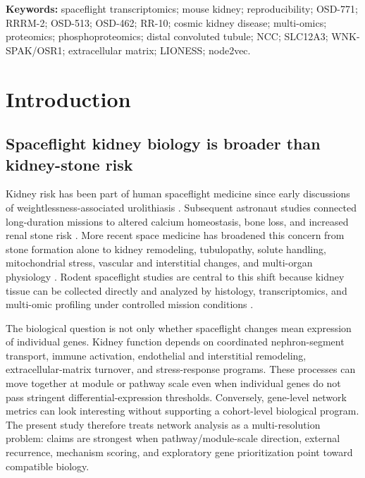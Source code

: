 \documentclass[11pt]{article}
\begin{document}
\vspace{0.3em}
\noindent\textbf{Keywords:} spaceflight transcriptomics; mouse kidney; reproducibility; OSD-771; RRRM-2; OSD-513; OSD-462; RR-10; cosmic kidney disease; multi-omics; proteomics; phosphoproteomics; distal convoluted tubule; NCC; SLC12A3; WNK-SPAK/OSR1; extracellular matrix; LIONESS; node2vec.

\clearpage
\tableofcontents
\clearpage

\section{Introduction}

\subsection{Spaceflight kidney biology is broader than kidney-stone risk}

Kidney risk has been part of human spaceflight medicine since early discussions of weightlessness-associated urolithiasis \citep{cockett1962astronautical}. Subsequent astronaut studies connected long-duration missions to altered calcium homeostasis, bone loss, and increased renal stone risk \citep{pietrzyk2007renal,smith2014men}. More recent space medicine has broadened this concern from stone formation alone to kidney remodeling, tubulopathy, solute handling, mitochondrial stress, vascular and interstitial changes, and multi-organ physiology \citep{siew2024cosmic,chouker2025impact,afshinnekoo2020fundamental}. Rodent spaceflight studies are central to this shift because kidney tissue can be collected directly and analyzed by histology, transcriptomics, and multi-omic profiling under controlled mission conditions \citep{daSilveira2020comprehensive,galazka2020rnaseq,finch2025strain}.

The biological question is not only whether spaceflight changes mean expression of individual genes. Kidney function depends on coordinated nephron-segment transport, immune activation, endothelial and interstitial remodeling, extracellular-matrix turnover, and stress-response programs. These processes can move together at module or pathway scale even when individual genes do not pass stringent differential-expression thresholds. Conversely, gene-level network metrics can look interesting without supporting a cohort-level biological program. The present study therefore treats network analysis as a multi-resolution problem: claims are strongest when pathway/module-scale direction, external recurrence, mechanism scoring, and exploratory gene prioritization point toward compatible biology.
\end{document}

